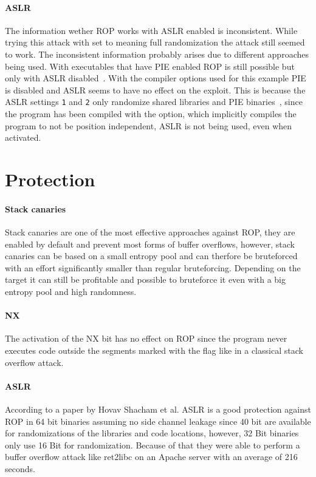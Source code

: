 \documentclass[journal=tosc,submission, notanonymous]{iacrtrans}
\begin{document}
\paragraph{ASLR}
The information wether ROP works with ASLR enabled is inconsistent. While trying this attack with  set to  meaning full randomization the attack still seemed to work. The inconsistent information probably arises due to different approaches being used. With executables that have PIE enabled ROP is still possible but only with ASLR disabled~\cite{el-sherei}. With the compiler options used for this example PIE is disabled and ASLR seems to have no effect on the exploit. This is because the ASLR settings \Verb+1+ and \Verb+2+ only randomize shared libraries and PIE binaries~\cite{rny}, since the program has been compiled with the  option, which implicitly compiles the program to not be position independent, ASLR is not being used, even when activated.

\section{Protection}
\paragraph{Stack canaries}
Stack canaries are one of the most effective approaches against ROP, they are enabled by default and prevent most forms of buffer overflows, however, stack canaries can be based on a small entropy pool and can therfore be bruteforced with an effort significantly smaller than regular bruteforcing. Depending on the target it can still be profitable and possible to bruteforce it even with a big entropy pool and high randomness.
\paragraph{NX}
The activation of the NX bit has no effect on ROP since the program never executes code outside the segments marked with the  flag like in a classical stack overflow attack.~\cite{ropsla}
\paragraph{ASLR}
According to a paper by Hovav Shacham et al. ASLR is a good protection against ROP in 64 bit binaries assuming no side channel leakage since 40 bit are available for randomizations of the libraries and code locations, however, 32 Bit binaries only use 16 Bit for randomization. Because of that they were able to perform a buffer overflow attack like ret2libc on an Apache server with an average of 216 seconds.~\cite{aslr}


\end{document}
